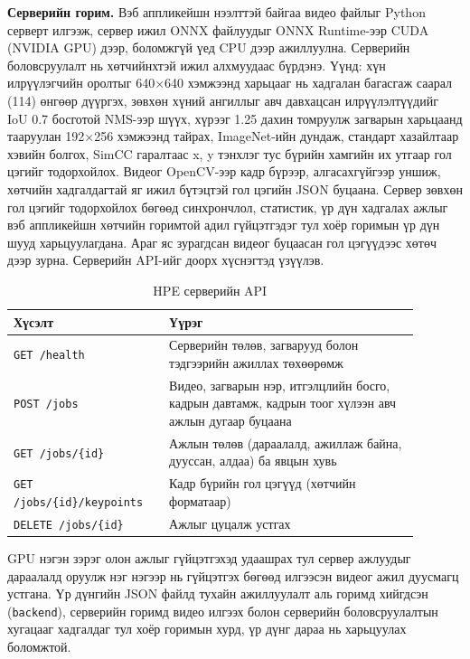 \textbf{Серверийн горим.} Вэб аппликейшн нээлттэй байгаа видео файлыг Python серверт илгээж, сервер ижил ONNX файлуудыг ONNX Runtime-ээр CUDA (NVIDIA GPU) дээр, боломжгүй үед CPU дээр ажиллуулна. Серверийн боловсруулалт нь хөтчийнхтэй ижил алхмуудаас бүрдэнэ. Үүнд: хүн илрүүлэгчийн оролтыг 640×640 хэмжээнд харьцааг нь хадгалан багасгаж саарал (114) өнгөөр дүүргэх, зөвхөн хүний ангиллыг авч давхацсан илрүүлэлтүүдийг IoU 0.7 босготой NMS-ээр шүүх, хүрээг 1.25 дахин томруулж загварын харьцаанд тааруулан 192×256 хэмжээнд тайрах, ImageNet-ийн дундаж, стандарт хазайлтаар хэвийн болгох, SimCC гаралтаас x, y тэнхлэг тус бүрийн хамгийн их утгаар гол цэгийг тодорхойлох. Видеог OpenCV-ээр кадр бүрээр, алгасахгүйгээр уншиж, хөтчийн хадгалдагтай яг ижил бүтэцтэй гол цэгийн JSON буцаана. Сервер зөвхөн гол цэгийг тодорхойлох бөгөөд синхрончлол, статистик, үр дүн хадгалах ажлыг вэб аппликейшн хөтчийн горимтой адил гүйцэтгэдэг тул хоёр горимын үр дүн шууд харьцуулагдана. Араг яс зурагдсан видеог буцаасан гол цэгүүдээс хөтөч дээр зурна. Серверийн API-ийг доорх хүснэгтэд үзүүлэв.

\begin{table}[H]
\centering
\caption{HPE серверийн API}
\label{tab:api}
\small
\begin{tabular}{|>{\raggedright\arraybackslash}p{0.330\linewidth}|>{\raggedright\arraybackslash}p{0.560\linewidth}|}
\hline
\textbf{Хүсэлт} & \textbf{Үүрэг} \\ \hline
\texttt{GET /health} & Серверийн төлөв, загварууд болон тэдгээрийн ажиллах төхөөрөмж \\ \hline
\texttt{POST /jobs} & Видео, загварын нэр, итгэлцлийн босго, кадрын давтамж, кадрын тоог хүлээн авч ажлын дугаар буцаана \\ \hline
\texttt{GET /jobs/\{id\}} & Ажлын төлөв (дараалалд, ажиллаж байна, дууссан, алдаа) ба явцын хувь \\ \hline
\texttt{GET /jobs/\{id\}/keypoints} & Кадр бүрийн гол цэгүүд (хөтчийн форматаар) \\ \hline
\texttt{DELETE /jobs/\{id\}} & Ажлыг цуцалж устгах \\ \hline
\end{tabular}
\end{table}

GPU нэгэн зэрэг олон ажлыг гүйцэтгэхэд удаашрах тул сервер ажлуудыг дараалалд оруулж нэг нэгээр нь гүйцэтгэх бөгөөд илгээсэн видеог ажил дуусмагц устгана. Үр дүнгийн JSON файлд тухайн ажиллуулалт аль горимд хийгдсэн (\texttt{backend}), серверийн горимд видео илгээх болон серверийн боловсруулалтын хугацааг хадгалдаг тул хоёр горимын хурд, үр дүнг дараа нь харьцуулах боломжтой.

